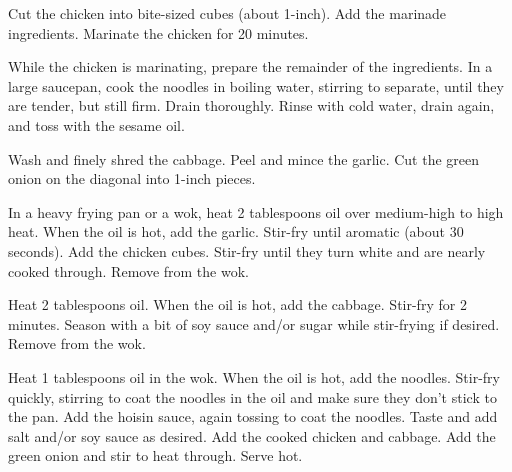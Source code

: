 
Cut the chicken into bite-sized cubes (about 1-inch). Add the marinade ingredients. Marinate the chicken for 20 minutes.

While the chicken is marinating, prepare the remainder of the ingredients. In a large saucepan, cook the noodles in boiling water, stirring to separate, until they are tender, but still firm. Drain thoroughly. Rinse with cold water, drain again, and toss with the sesame oil.

Wash and finely shred the cabbage. Peel and mince the garlic. Cut the green onion on the diagonal into 1-inch pieces.

In a heavy frying pan or a wok, heat 2  tablespoons oil over medium-high to high heat. When the oil is hot, add the garlic. Stir-fry until aromatic (about 30 seconds). Add the chicken cubes. Stir-fry until they turn white and are nearly cooked through. Remove from the wok. 

Heat 2 tablespoons oil. When the oil is hot, add the cabbage. Stir-fry for 2 minutes. Season with a bit of soy sauce and/or sugar while stir-frying if desired. Remove from the wok.

Heat 1  tablespoons oil in the wok. When the oil is hot, add the noodles. Stir-fry quickly, stirring to coat the noodles in the oil and make sure they don't stick to the pan. Add the hoisin sauce, again tossing to coat the noodles. Taste and add salt and/or soy sauce as desired. Add the cooked chicken and cabbage. Add the green onion and stir to heat through. Serve hot.